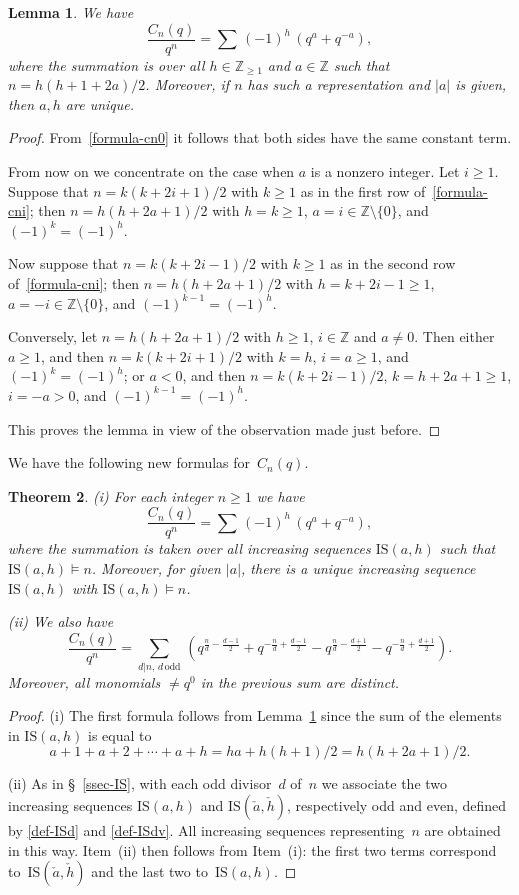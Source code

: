 \documentclass[11pt, a4paper]{amsart}
\newtheorem{theorem}{Theorem}[section]
\newtheorem{lemma}[theorem]{Lemma}
\theoremstyle{definition}
\newcommand\ZZ{\mathbb{Z}}
\newcommand\IS{\mathrm{IS}}
\numberwithin{equation}{section}
\begin{document}
\begin{lemma}\label{formula1} 
We have
\[
\frac{C_n(q)}{q^n} = \sum\,  (-1)^h \, \left( q^a + q^{-a} \right), 
\]
where the summation is over all $h\in\ZZ_{\geq 1}$ and $a\in \ZZ$ such that $n=h(h+1+2a)/2$. 
Moreover, if $n$ has such a representation and $|a|$ is given, then $a,h$ are unique.
\end{lemma}
 
\begin{proof}
From~\eqref{formula-cn0} it follows that both sides have the same constant term. 

From now on we concentrate on the case when $a$ is a nonzero integer.
Let $i\geq 1$.
Suppose that $n=k(k+2i +1)/2$ with $k\geq 1$ as in the first row of~\eqref{formula-cni}; 
then $n=h(h+2a +1)/2$ with $h=k \geq 1$, $a=i\in \ZZ \setminus \{0\}$, and $(-1)^k=(-1)^h$. 

Now suppose that $n = k(k+2i -1)/2$ with $k\geq 1$ as in the second row of~\eqref{formula-cni}; 
then $n=h(h+2a +1)/2$ with $h=k+2i-1\geq 1$, $a=-i\in \ZZ \setminus \{0\}$, and $(-1)^{k-1}=(-1)^h$. 

Conversely, let $n=h(h+2a +1)/2$ with $h\geq 1$, $i\in \ZZ$ and $a\neq 0$. 
Then either $a\geq 1$, and then $n=k(k+2i +1)/2$ with $k=h$, $i=a\geq 1$, and $(-1)^k=(-1)^h$; 
or $a < 0$, and then $n=k(k+2i-1)/2$, $k=h+2a+1\geq 1$, $i = -a > 0$, and $(-1)^{k-1}=(-1)^h$.

This proves the lemma in view of the observation made just before.
\end{proof}

 
We have the following new formulas for~$C_n(q)$.

\begin{theorem}\label{th-Cn}
(i) For each integer $n\geq 1$ we have 
\[
\frac{C_n(q)}{q^n} = \sum \, (-1)^h \, \left( q^a + q^{-a} \right),
\] 
where the summation is taken over all increasing sequences $\IS(a,h)$ such that $\IS(a,h) \models n$. 
Moreover, for given $|a|$, there is a unique increasing sequence $\IS(a,h)$ with $\IS(a,h) \models n$. 

(ii) We also have
\[
\frac{C_n(q)}{q^n} = \sum_{d | n , \, d \, \mathrm{odd}} \, 
\left( q^{\frac{n}{d} - \frac{d-1}{2}} +  q^{-\frac{n}{d} + \frac{d-1}{2}}  
- q^{\frac{n}{d} - \frac{d+1}{2}}  - q^{-\frac{n}{d} + \frac{d+1}{2}} \right) .
\] 
Moreover, all monomials $\neq q^0$ in the previous sum are distinct.
\end{theorem}

\begin{proof} 
(i) The first formula follows from Lemma~\ref{formula1} since the sum of the elements in $\IS(a,h)$ is 
equal to 
\[
a+1+a+2+ \cdots+a+h = ha+h(h+1)/2 = h(h+2a+1)/2.
\]

(ii) As in \S~\ref{ssec-IS}, with each odd divisor~$d$ of~$n$ we associate the two increasing 
sequences $\IS(a,h)$ and $\IS(\check a,\check h)$, respectively odd and even, defined by \eqref{def-ISd} and \eqref{def-ISdv}. 
All increasing sequences representing~$n$ are obtained in this way. 
Item~(ii) then follows from Item~(i): the first two terms correspond to~$\IS(\check{a}, \check{h})$ and the last two to~$\IS(a,h)$.
\end{proof}
\end{document}
